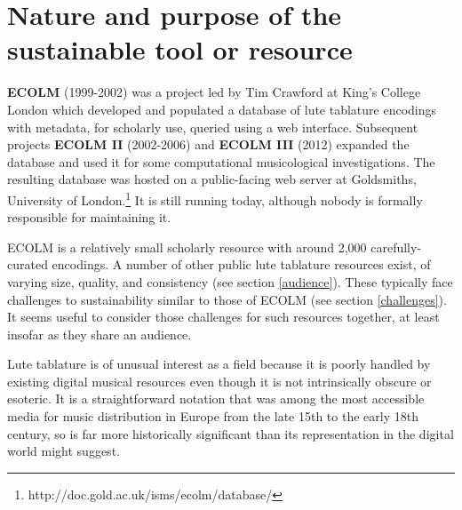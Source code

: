 \documentclass[sigconf, nonacm=true]{acmart}
\begin{document}
\maketitle
\begin{sloppypar}


  \section{Nature and purpose of the sustainable tool or resource}

  {\bf ECOLM} (1999-2002) was a project led by Tim Crawford at King's
  College London which developed and populated a database of lute
  tablature encodings with metadata, for scholarly use, queried using
  a web interface. Subsequent projects {\bf ECOLM II} (2002-2006) and
  {\bf ECOLM III} (2012) expanded the database and used it for some
  computational musicological investigations. The resulting database
  was hosted on a public-facing web server at Goldsmiths, University
  of London.\footnote{http://doc.gold.ac.uk/isms/ecolm/database/} It
  is still running today, although nobody is formally responsible for
  maintaining it.

  ECOLM is a relatively small scholarly resource with around 2,000
  carefully-curated encodings. A number of other public lute tablature
  resources exist, of varying size, quality, and consistency (see
  section \ref{audience}). These typically face challenges to
  sustainability similar to those of ECOLM (see section
  \ref{challenges}). It seems useful to consider those challenges for
  such resources together, at least insofar as they share an
  audience.

  Lute tablature is of unusual interest as a field because it is
  poorly handled by existing digital musical resources even though it
  is not intrinsically obscure or esoteric. It is a straightforward
  notation that was among the most accessible media for music
  distribution in Europe from the late 15th to the early 18th century,
  so is far more historically significant than its representation in
  the digital world might suggest.
  

\end{sloppypar}
\end{document}
